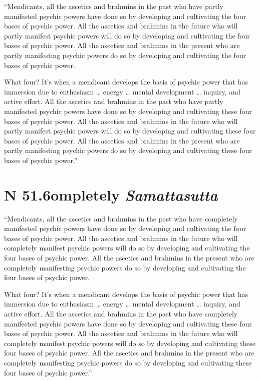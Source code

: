 \documentclass[12pt,openany]{book}%
\newcommand*{\suttatitleacronym}[1]{\smaller[2]{#1}\vspace*{.3em}}
\newcommand*{\suttatitletranslation}[1]{\linebreak{#1}}
\newcommand*{\suttatitleroot}[1]{\linebreak\smaller[2]\itshape{#1}}
\newcommand*{\tocacronym}[1]{\hspace*{-3.3em}{#1}\quad}
\newcommand*{\toctranslation}[1]{#1}
\newcommand*{\tocroot}[1]{(\textit{#1})}
\begin{document}
“Mendicants, all the ascetics and brahmins in the past who have partly manifested psychic powers have done so by developing and cultivating the four bases of psychic power. All the ascetics and brahmins in the future who will partly manifest psychic powers will do so by developing and cultivating the four bases of psychic power. All the ascetics and brahmins in the present who are partly manifesting psychic powers do so by developing and cultivating the four bases of psychic power. 

What four? It’s when a mendicant develops the basis of psychic power that has immersion due to enthusiasm … energy … mental development … inquiry, and active effort. All the ascetics and brahmins in the past who have partly manifested psychic powers have done so by developing and cultivating these four bases of psychic power. All the ascetics and brahmins in the future who will partly manifest psychic powers will do so by developing and cultivating these four bases of psychic power. All the ascetics and brahmins in the present who are partly manifesting psychic powers do so by developing and cultivating these four bases of psychic power.” 

%
\section*{{\suttatitleacronym SN 51.6}{\suttatitletranslation Completely }{\suttatitleroot Samattasutta}}
\addcontentsline{toc}{section}{\tocacronym{SN 51.6} \toctranslation{Completely } \tocroot{Samattasutta}}

“Mendicants, all the ascetics and brahmins in the past who have completely manifested psychic powers have done so by developing and cultivating the four bases of psychic power. All the ascetics and brahmins in the future who will completely manifest psychic powers will do so by developing and cultivating the four bases of psychic power. All the ascetics and brahmins in the present who are completely manifesting psychic powers do so by developing and cultivating the four bases of psychic power. 

What four? It’s when a mendicant develops the basis of psychic power that has immersion due to enthusiasm … energy … mental development … inquiry, and active effort. All the ascetics and brahmins in the past who have completely manifested psychic powers have done so by developing and cultivating these four bases of psychic power. All the ascetics and brahmins in the future who will completely manifest psychic powers will do so by developing and cultivating these four bases of psychic power. All the ascetics and brahmins in the present who are completely manifesting psychic powers do so by developing and cultivating these four bases of psychic power.” 
\end{document}
